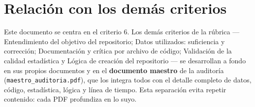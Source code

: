 \section{Relación con los demás criterios}

Este documento se centra en el criterio 6. Los demás criterios de la
rúbrica — Entendimiento del objetivo del repositorio; Datos utilizados: suficiencia y corrección; Documentación y crítica por archivo de código; Validación de la calidad estadística y Lógica de creación del repositorio — se desarrollan a fondo en sus propios documentos
y en el \textbf{documento maestro} de la auditoría (\texttt{maestro\_auditoria.pdf}),
que los integra todos con el detalle completo de datos, código, estadística,
lógica y línea de tiempo. Esta separación evita repetir contenido: cada PDF
profundiza en lo suyo.
